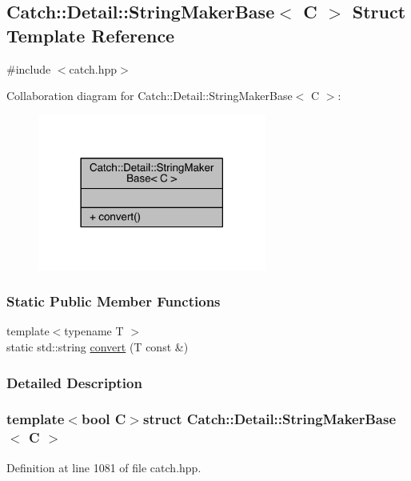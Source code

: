 \hypertarget{a00082}{}\subsection{Catch\+:\+:Detail\+:\+:String\+Maker\+Base$<$ C $>$ Struct Template Reference}
\label{a00082}


{\ttfamily \#include $<$catch.\+hpp$>$}



Collaboration diagram for Catch\+:\+:Detail\+:\+:String\+Maker\+Base$<$ C $>$\+:\nopagebreak
\begin{figure}[H]
\begin{center}
\leavevmode
\includegraphics[width=213pt]{a00305}
\end{center}
\end{figure}
\subsubsection*{Static Public Member Functions}
\begin{DoxyCompactItemize}
\item 
{\footnotesize template$<$typename T $>$ }\\static std\+::string \hyperlink{a00082_a8eb9f635dc413a5758e22614bafaf1a3}{convert} (T const \&)
\end{DoxyCompactItemize}


\subsubsection{Detailed Description}
\subsubsection*{template$<$bool C$>$struct Catch\+::\+Detail\+::\+String\+Maker\+Base$<$ C $>$}



Definition at line 1081 of file catch.\+hpp.



